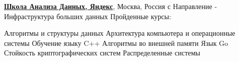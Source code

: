 \documentclass[a4paper, MMyyyy,nonstopmode]{simpleresumecv_ru}
\begin{document}
\begin{Body}
\Entry
\href{https://yandexdataschool.ru/}
{\textbf{Школа Анализа Данных, Яндекс}},
Москва, Россия 
\hfill
с 
\Gap
\BulletItem
Направление - Инфраструктура больших данных
\Gap
\BulletItem
Пройденные курсы:
\begin{Detail}
\SubBulletItem
Алгоритмы и структуры данных
\SubBulletItem
Архитектура компьютера и операционные системы
\SubBulletItem
Обучение языку C++
\SubBulletItem
Алгоритмы во внешней памяти
\SubBulletItem
Язык Go
\SubBulletItem
Стойкость криптографических систем
\SubBulletItem
Распределенные системы
\end{Detail}
%











\end{Body}
\end{document}
